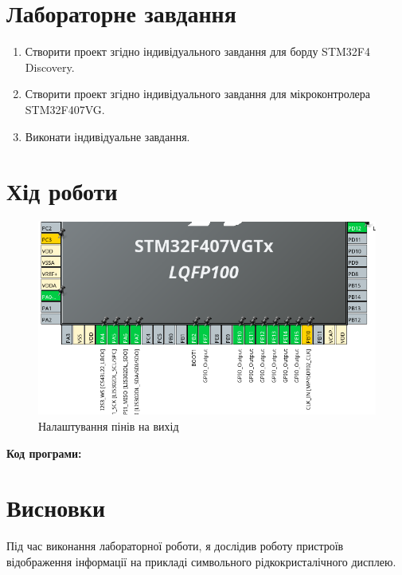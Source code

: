 \documentclass[oneside,14pt]{extarticle}
\begin{document}
\begin{normalsize}
    \section*{\hfil Лабораторне завдання\hfil}
	\begin{enumerate}
		\item Створити проект згідно індивідуального завдання для борду STM32F4
		Discovery.
		\item Створити проект згідно індивідуального завдання для мікроконтролера
		STM32F407VG.
		\item Виконати індивідуальне завдання.
	\end{enumerate}

	\section*{\hfil Хід роботи\hfil}
	
	\begin{figure}[H]
		\centering
		\includegraphics[width=\columnwidth]{1}
		\caption{Налаштування пінів на вихід}
	\end{figure}
	
	\textbf{Код програми:}
	
	
	\section*{\hfil Висновки\hfil}
	Під час виконання лабораторної роботи, я дослідив роботу пристроїв відображення інформації на
	прикладі символьного рідкокристалічного дисплею.
		    
\end{normalsize}
\end{document}
